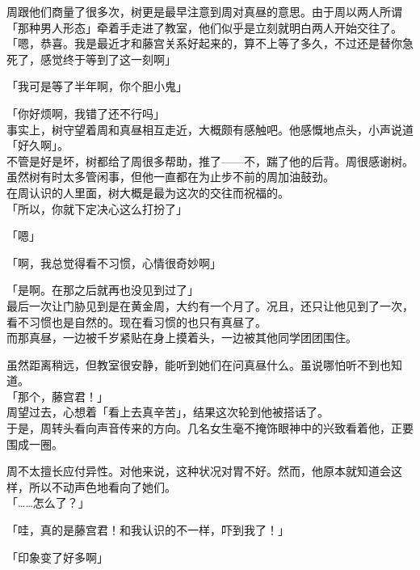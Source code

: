 周跟他们商量了很多次，树更是最早注意到周对真昼的意思。由于周以两人所谓「那种男人形态」牵着手走进了教室，他们似乎是立刻就明白两人开始交往了。\\

「嗯，恭喜。我是最近才和藤宫关系好起来的，算不上等了多久，不过还是替你急死了，感觉终于等到了这一刻啊」

「我可是等了半年啊，你个胆小鬼」

「你好烦啊，我错了还不行吗」\\

事实上，树守望着周和真昼相互走近，大概颇有感触吧。他感慨地点头，小声说道「好久啊」。\\

不管是好是坏，树都给了周很多帮助，推了——不，踹了他的后背。周很感谢树。虽然树有时太多管闲事，但他一直都在为止步不前的周加油鼓劲。\\

在周认识的人里面，树大概是最为这次的交往而祝福的。\\

「所以，你就下定决心这么打扮了」

「嗯」

「啊，我总觉得看不习惯，心情很奇妙啊」

「是啊。在那之后就再也没见到过了」\\

最后一次让门胁见到是在黄金周，大约有一个月了。况且，还只让他见到了一次，看不习惯也是自然的。现在看习惯的也只有真昼了。\\

而那真昼，一边被千岁紧贴在身上摸着头，一边被其他同学团团围住。

虽然距离稍远，但教室很安静，能听到她们在问真昼什么。虽说哪怕听不到也知道。\\

「那个，藤宫君！」\\

周望过去，心想着「看上去真辛苦」，结果这次轮到他被搭话了。\\

于是，周转头看向声音传来的方向。几名女生毫不掩饰眼神中的兴致看着他，正要围成一圈。

周不太擅长应付异性。对他来说，这种状况对胃不好。然而，他原本就知道会这样，所以不动声色地看向了她们。\\

「……怎么了？」

「哇，真的是藤宫君！和我认识的不一样，吓到我了！」

「印象变了好多啊」

